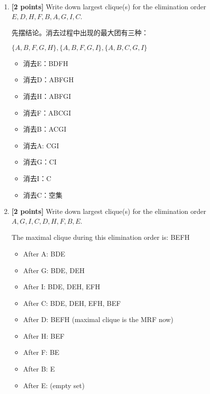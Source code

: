 \documentclass[12pt]{article}
\begin{document}
\begin{enumerate}

	\item \textbf{[2 points]} Write down largest clique(s) for the elimination order $ E, D, H, F, B, A, G, I, C $.

	      \begin{solution}
		      先摆结论。消去过程中出现的最大团有三种：

		      $\{A,B,F,G,H\}, \{A,B,F,G,I\}, \{A,B,C,G,I\}$
		      \begin{itemize}
			      \item 消去E：BDFH
			      \item 消去D：ABFGH
			      \item 消去H：ABFGI
			      \item 消去F：ABCGI
			      \item 消去B：ACGI
			      \item 消去A: CGI
			      \item 消去G：CI
			      \item 消去I：C
			      \item 消去C：空集
		      \end{itemize}
	      \end{solution}


	\item \textbf{[2 points]} Write down largest clique(s) for the elimination order $ A, G, I, C, D, H, F, B, E $.

	      \begin{solution}

		      The maximal clique during this elimination order is: BEFH

		      \begin{itemize}
			      \item After A: BDE
			      \item After G: BDE, DEH
			      \item After I: BDE, DEH, EFH
			      \item After C: BDE, DEH, EFH, BEF
			      \item After D: BEFH (maximal clique is the MRF now)
			      \item After H: BEF
			      \item After F: BE
			      \item After B: E
			      \item After E: (empty set)
		      \end{itemize}

	      \end{solution}


\end{enumerate}
\end{document}
